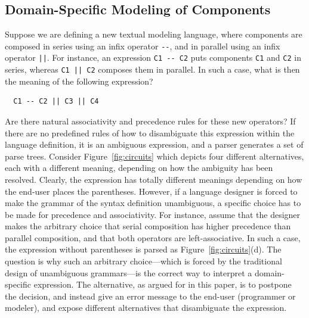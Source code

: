 \documentclass[runningheads]{llncs}
\begin{document}
\subsection{Domain-Specific Modeling of Components}
Suppose we are defining a new textual modeling language, where components are composed in series using an infix operator \verb~--~, and in parallel using an infix operator \verb~||~. For instance, an expression \verb~C1 -- C2~ puts components \verb~C1~ and \verb~C2~ in series, whereas \verb~C1 || C2~ composes them in parallel. In such a case, what is then the meaning of the following expression?
\begin{verbatim}
  C1 -- C2 || C3 || C4
\end{verbatim}

\noindent Are there natural associativity and precedence rules for these new operators? If there are no predefined rules of how to disambiguate this expression within the language definition, it is an ambiguous expression, and a parser generates a set of parse trees. Consider Figure~\ref{fig:circuits} which depicts four different alternatives, each with a different meaning, depending on how the ambiguity has been resolved. Clearly, the expression has totally different meanings depending on how the end-user places the parentheses. However, if a language designer is forced to make the grammar of the syntax definition unambiguous, a specific choice has to be made for precedence and associativity. For instance, assume that the designer makes the arbitrary choice that serial composition has higher precedence than parallel composition, and that both operators are left-associative. In such a case, the expression without parentheses is parsed as Figure~\ref{fig:circuits}(d). The question is why such an arbitrary choice---which is forced by the traditional design of unambiguous grammars---is the correct way to interpret a domain-specific expression. The alternative, as argued for in this paper, is to postpone the decision, and instead give an error message to the end-user (programmer or modeler), and expose different alternatives that disambiguate the expression.
\end{document}
